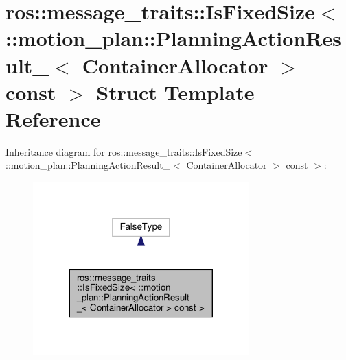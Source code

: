 \hypertarget{structros_1_1message__traits_1_1IsFixedSize_3_01_1_1motion__plan_1_1PlanningActionResult___3_01C9817b0017bdfdc4358afdf1b9cb420fd}{}\section{ros\+:\+:message\+\_\+traits\+:\+:Is\+Fixed\+Size$<$ \+:\+:motion\+\_\+plan\+:\+:Planning\+Action\+Result\+\_\+$<$ Container\+Allocator $>$ const $>$ Struct Template Reference}
\label{structros_1_1message__traits_1_1IsFixedSize_3_01_1_1motion__plan_1_1PlanningActionResult___3_01C9817b0017bdfdc4358afdf1b9cb420fd}


Inheritance diagram for ros\+:\+:message\+\_\+traits\+:\+:Is\+Fixed\+Size$<$ \+:\+:motion\+\_\+plan\+:\+:Planning\+Action\+Result\+\_\+$<$ Container\+Allocator $>$ const $>$\+:
\nopagebreak
\begin{figure}[H]
\begin{center}
\leavevmode
\includegraphics[width=236pt]{structros_1_1message__traits_1_1IsFixedSize_3_01_1_1motion__plan_1_1PlanningActionResult___3_01C9997c96c848c4f7fe3ae98c5dce90260}
\end{center}
\end{figure}


